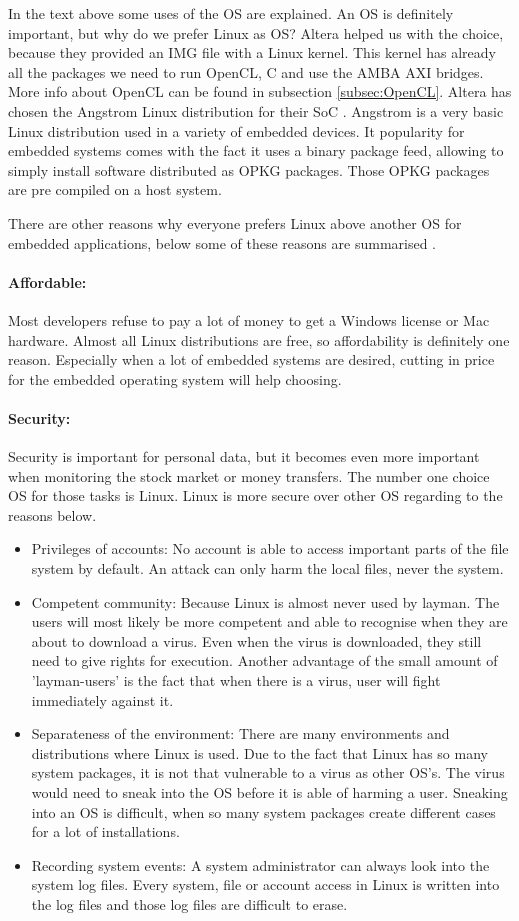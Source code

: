 \documentclass[12pt,a4paper,english,twoside,openright]{tutthesis}
\begin{document}
In the text above some uses of the OS are explained. An OS is definitely important, but why do we prefer Linux as OS? Altera helped us with the choice, because they provided an IMG file with a Linux kernel. This kernel has already all the packages we need to run OpenCL, C and use the AMBA AXI bridges. More info about OpenCL can be found in subsection \ref{subsec:OpenCL}. Altera has chosen the Angstrom Linux distribution for their SoC \cite{Angstrom}. Angstrom is a very basic Linux distribution used in a variety of embedded devices. It popularity for embedded systems comes with the fact it uses a binary package feed, allowing to simply install software distributed as OPKG packages. Those OPKG packages are pre compiled on a host system.

There are other reasons why everyone prefers Linux above another OS for embedded applications, below some of these reasons are summarised \cite{LinuxOS}.
				\paragraph{Affordable:}
Most developers refuse to pay a lot of money to get a Windows license or Mac hardware. Almost all Linux distributions are free, so affordability is definitely one reason. Especially when a lot of embedded systems are desired, cutting in price for the embedded operating system will help choosing.
				\paragraph{Security:} \label{par:security}
Security is important for personal data, but it becomes even more important when monitoring the stock market or money transfers. The number one choice OS for those tasks is Linux. Linux is more secure over other OS regarding to the reasons below.
\begin{itemize}
	\item Privileges of accounts:	No account is able to access important parts of the file system by default. An attack can only harm the local files, never the system.
	\item Competent community:	Because Linux is almost never used by layman. The users will most likely be more competent and able to recognise when they are about to download a virus. Even when the virus is downloaded, they still need to give rights for execution. Another advantage of the small amount of 'layman-users' is the fact that when there is a virus, user will fight immediately against it.
	\item Separateness of the environment:	There are many environments and distributions where Linux is used. Due to the fact that Linux has so many system packages, it is not that vulnerable to a virus as other OS's. The virus would need to sneak into the OS before it is able of harming a user. Sneaking into an OS is difficult, when so many system packages create different cases for a lot of installations.
	\item Recording system events:	A system administrator can always look into the system log files. Every system, file or account access in Linux is written into the log files and those log files are difficult to erase.
\end{itemize}
\end{document}
